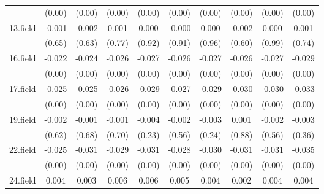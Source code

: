 {\begin{tabular}{l*{9}{c}}
          &   (0.00)         &   (0.00)         &   (0.00)         &   (0.00)         &   (0.00)         &   (0.00)         &   (0.00)         &   (0.00)         &   (0.00)         \\
[1em]
13.field  &   -0.001         &   -0.002         &    0.001         &    0.000         &   -0.000         &    0.000         &   -0.002         &    0.000         &    0.001         \\
          &   (0.65)         &   (0.63)         &   (0.77)         &   (0.92)         &   (0.91)         &   (0.96)         &   (0.60)         &   (0.99)         &   (0.74)         \\
[1em]
16.field  &   -0.022\sym{***}&   -0.024\sym{***}&   -0.026\sym{***}&   -0.027\sym{***}&   -0.026\sym{***}&   -0.027\sym{***}&   -0.026\sym{***}&   -0.027\sym{***}&   -0.029\sym{***}\\
          &   (0.00)         &   (0.00)         &   (0.00)         &   (0.00)         &   (0.00)         &   (0.00)         &   (0.00)         &   (0.00)         &   (0.00)         \\
[1em]
17.field  &   -0.025\sym{***}&   -0.025\sym{***}&   -0.026\sym{***}&   -0.029\sym{***}&   -0.027\sym{***}&   -0.029\sym{***}&   -0.030\sym{***}&   -0.030\sym{***}&   -0.033\sym{***}\\
          &   (0.00)         &   (0.00)         &   (0.00)         &   (0.00)         &   (0.00)         &   (0.00)         &   (0.00)         &   (0.00)         &   (0.00)         \\
[1em]
19.field  &   -0.002         &   -0.001         &   -0.001         &   -0.004         &   -0.002         &   -0.003         &    0.001         &   -0.002         &   -0.003         \\
          &   (0.62)         &   (0.68)         &   (0.70)         &   (0.23)         &   (0.56)         &   (0.24)         &   (0.88)         &   (0.56)         &   (0.36)         \\
[1em]
22.field  &   -0.025\sym{***}&   -0.031\sym{***}&   -0.029\sym{***}&   -0.031\sym{***}&   -0.028\sym{***}&   -0.030\sym{***}&   -0.031\sym{***}&   -0.031\sym{***}&   -0.035\sym{***}\\
          &   (0.00)         &   (0.00)         &   (0.00)         &   (0.00)         &   (0.00)         &   (0.00)         &   (0.00)         &   (0.00)         &   (0.00)         \\
[1em]
24.field  &    0.004         &    0.003         &    0.006\sym{*}  &    0.006\sym{*}  &    0.005         &    0.004         &    0.002         &    0.004         &    0.004         \\

\end{tabular}}
